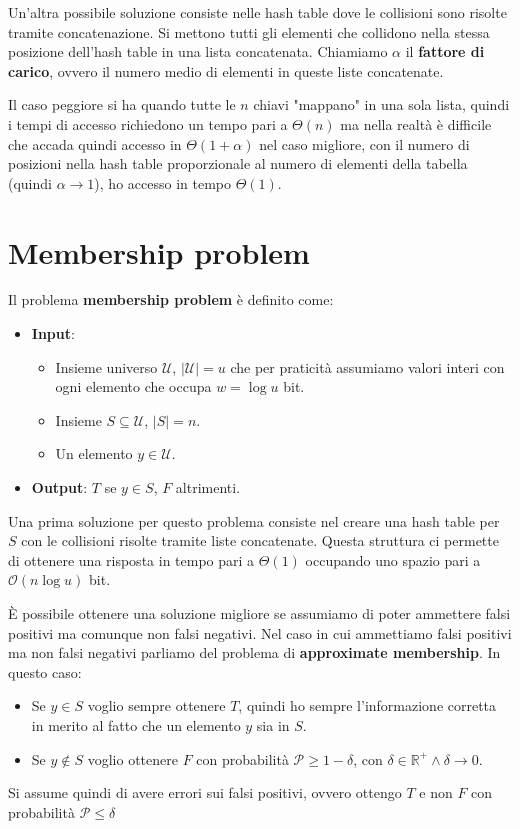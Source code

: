 Un'altra possibile soluzione consiste nelle hash table dove le collisioni sono
risolte tramite concatenazione. Si mettono tutti gli elementi che collidono nella
stessa posizione dell'hash table in una lista concatenata. Chiamiamo $\alpha$ il
\textbf{fattore di carico}, ovvero il numero medio di elementi in queste liste
concatenate.

Il caso peggiore si ha quando tutte le $n$ chiavi "mappano" in una sola lista,
quindi i tempi di accesso richiedono un tempo pari a $\Theta(n)$ ma nella realtà
è difficile che accada quindi accesso in $\Theta(1 + \alpha)$ nel caso migliore,
con il numero di posizioni nella hash table proporzionale al numero di elementi
della tabella (quindi $\alpha \to 1$), ho accesso in tempo $\Theta(1)$.
\section{Membership problem}
\begin{definizione}
    Il problema \textbf{membership problem} è definito come:
    \begin{itemize}
        \item \textbf{Input}:
              \begin{itemize}
                  \item Insieme universo $\mathcal{U}$, $|\mathcal{U}| = u$ che
                        per praticità assumiamo valori interi con ogni elemento
                        che occupa $w = \log u$ bit.
                  \item Insieme $S \subseteq \mathcal{U}$, $|S| = n$.
                  \item Un elemento $y \in \mathcal{U}$.
              \end{itemize}
        \item \textbf{Output}: $T$ se $y \in S$, $F$ altrimenti.
    \end{itemize}
\end{definizione}
Una prima soluzione per questo problema consiste nel creare una hash table per $S$
con le collisioni risolte tramite liste concatenate. Questa struttura ci permette
di ottenere una risposta in tempo pari a $\Theta(1)$ occupando uno spazio pari a
$\mathcal{O}(n \log u)$ bit.

È possibile ottenere una soluzione migliore se assumiamo di poter ammettere falsi
positivi ma comunque non falsi negativi. Nel caso in cui ammettiamo falsi positivi
ma non falsi negativi parliamo del problema di \textbf{approximate membership}.
In questo caso:
\begin{itemize}
    \item Se $y \in S$ voglio sempre ottenere $T$, quindi ho sempre l'informazione
          corretta in merito al fatto che un elemento $y$ sia in $S$.
    \item Se $y \notin S$ voglio ottenere $F$ con probabilità $\mathcal{P} \geq
              1 - \delta$, con $\delta \in \mathbb{R}^{+} \land \delta \to 0$.
\end{itemize}
Si assume quindi di avere errori sui falsi positivi, ovvero ottengo $T$ e non $F$
con probabilità $\mathcal{P} \leq \delta$

